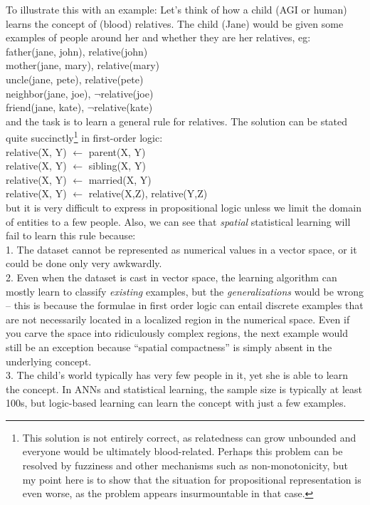 To illustrate this with an example:  Let's think of how a child (AGI or human) learns the concept of (blood) relatives.  The child (Jane) would be given some examples of people around her and whether they are her relatives, eg:\\
\hspace*{1cm} father(jane, john), relative(john)\\
\hspace*{1cm} mother(jane, mary), relative(mary)\\
\hspace*{1cm} uncle(jane, pete), relative(pete)\\
\hspace*{1cm} neighbor(jane, joe), $\neg$relative(joe)\\
\hspace*{1cm} friend(jane, kate), $\neg$relative(kate)\\
and the task is to learn a general rule for relatives.  The solution can be stated quite succinctly\footnote{This solution is not entirely correct, as relatedness can grow unbounded and everyone would be ultimately blood-related.  Perhaps this problem can be resolved by fuzziness and other mechanisms such as non-monotonicity, but my point here is to show that the situation for propositional representation is even worse, as the problem appears insurmountable in that case.} in first-order logic:\\
\hspace*{1cm} relative(X, Y) $\leftarrow$ parent(X, Y)\\
\hspace*{1cm} relative(X, Y) $\leftarrow$ sibling(X, Y)\\
\hspace*{1cm} relative(X, Y) $\leftarrow$ married(X, Y)\\
\hspace*{1cm} relative(X, Y) $\leftarrow$ relative(X,Z), relative(Y,Z)\\
but it is very difficult to express in propositional logic unless we limit the domain of entities to a few people.  Also, we can see that \textit{spatial} statistical learning will fail to learn this rule because:\\
1. The dataset cannot be represented as numerical values in a vector space, or it could be done only very awkwardly.\\
2. Even when the dataset is cast in vector space, the learning algorithm can mostly learn to classify \textit{existing} examples, but the \textit{generalizations} would be wrong -- this is because the formulae in first order logic can entail discrete examples that are not necessarily located in a localized region in the numerical space.  Even if you carve the space into ridiculously complex regions, the next example would still be an exception because ``spatial compactness'' is simply absent in the underlying concept.\\
3. The child's world typically has very few people in it, yet she is able to learn the concept.  In ANNs and statistical learning, the sample size is typically at least 100s, but logic-based learning can learn the concept with just a few examples.

